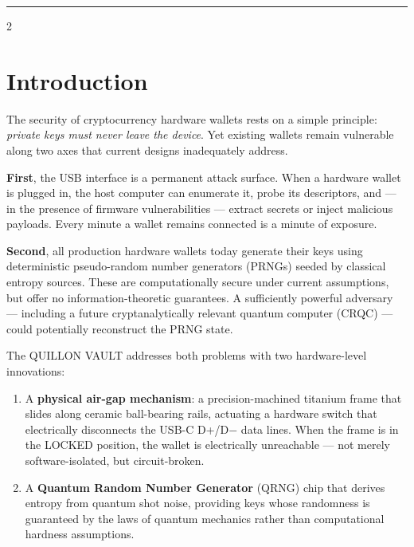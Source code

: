 \documentclass[11pt,a4paper]{article}
\begin{document}
\vspace{0.3em}
\noindent\textcolor{qcopper}{\rule{\textwidth}{0.5pt}}

\vspace{1em}

\begin{multicols}{2}

\section{Introduction}

The security of cryptocurrency hardware wallets rests on a simple principle:
\emph{private keys must never leave the device}. Yet existing wallets remain
vulnerable along two axes that current designs inadequately address.

\textbf{First}, the USB interface is a permanent attack surface. When a hardware
wallet is plugged in, the host computer can enumerate it, probe its descriptors,
and --- in the presence of firmware vulnerabilities --- extract secrets or inject
malicious payloads. Every minute a wallet remains connected is a minute of
exposure.

\textbf{Second}, all production hardware wallets today generate their keys
using deterministic pseudo-random number generators (PRNGs) seeded by
classical entropy sources. These are computationally secure under current
assumptions, but offer no information-theoretic guarantees. A sufficiently
powerful adversary --- including a future cryptanalytically relevant quantum
computer (CRQC) --- could potentially reconstruct the PRNG state.

The QUILLON VAULT addresses both problems with two hardware-level innovations:

\begin{enumerate}[leftmargin=1.5em,itemsep=2pt]
  \item A \textbf{physical air-gap mechanism}: a precision-machined titanium
    frame that slides along ceramic ball-bearing rails, actuating a hardware
    switch that electrically disconnects the USB-C D+/D$-$ data lines.
    When the frame is in the LOCKED position, the wallet is electrically
    unreachable --- not merely software-isolated, but circuit-broken.

  \item A \textbf{Quantum Random Number Generator} (QRNG) chip that derives
    entropy from quantum shot noise, providing keys whose randomness is
    guaranteed by the laws of quantum mechanics rather than computational
    hardness assumptions.
\end{enumerate}


\end{multicols}
\end{document}

